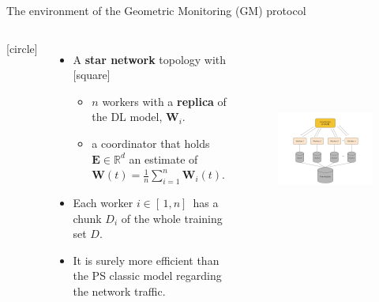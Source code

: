 \begin{frame}{The environment of the Geometric Monitoring (GM) protocol}
    \begin{columns}
        [circle]
        \begin{itemize}
            \item{A \textbf{star network} topology with
            [square]
            \begin{itemize}
                \item $n$ workers with a \textbf{replica} of the DL model, $\pmb{W}_i$.
                \item a coordinator that holds $\pmb{E}\in\mathbb{R}^d$ an estimate of $\pmb{W}(t)=\frac{1}{n}\sum_{i=1}^n\pmb{W}_i(t)$.
            \end{itemize}}
            \vspace{0.1cm}
            \item{Each worker $i \in [\,1,n]\,$ has a chunk $D_i$ of the whole training set $D$.}
            \vspace{0.1cm}
            \item{It is surely more efficient than the PS classic model regarding the network traffic.}
        \end{itemize}
        \begin{figure}
            \includegraphics[width=8cm,height=6.5cm,center]{images/ml-fgm.png}\label{fig:ml-gm}
        \end{figure}
    \end{columns}
\end{frame}

